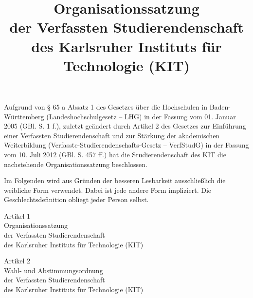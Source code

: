 \documentclass[a4paper,parskip=half,pointlessnumbers,twocolumn]{scrartcl}
\title{Organisationssatzung \\ der Verfassten Studierendenschaft \\ des Karlsruher Instituts für Technologie (KIT)}
\author{}
\date{}
\begin{document}
\pagestyle{empty}
\maketitle
\newpage 
\rule{0mm}{0mm} \newpage %
\rule{0mm}{0mm} \newpage %

\setcounter{page}{1}
\pagestyle{plain}
\tableofcontents \bigskip

Aufgrund von § 65 a Absatz 1 des Gesetzes über die Hochschulen in Baden-Württemberg (Landeshochschulgesetz -- LHG) in der Fassung vom 01. Januar 2005 (GBl. S. 1 f.), zuletzt geändert durch Artikel 2 des Gesetzes zur Einführung einer Verfassten Studierendenschaft und zur Stärkung der akademischen Weiterbildung (Verfasste-Studierendenschafts-Gesetz -- VerfStudG) in der Fassung vom 10. Juli 2012 (GBl. S. 457 ff.) hat die Studierendenschaft des KIT die nachstehende Organisationssatzung beschlossen.

Im Folgenden wird aus Gründen der besseren Lesbarkeit ausschließlich die weibliche Form verwendet. Dabei ist jede andere Form impliziert. Die Geschlechtsdefinition obliegt jeder Person selbst. \bigskip

\newpage

{\begin{center} Artikel 1 \\ Organisationssatzung \\ der Verfassten Studierendenschaft \\ des Karlsruher Instituts für Technologie (KIT) \end{center}}

\begin{contract}
\setcounter{Paragraph}{0}
 \bigskip
\end{contract}


{\begin{center} Artikel 2 \\ Wahl- und Abstimmungsordnung \\ der Verfassten Studierendenschaft \\ des Karlsruher Instituts für Technologie (KIT) \end{center}}
\end{document}

